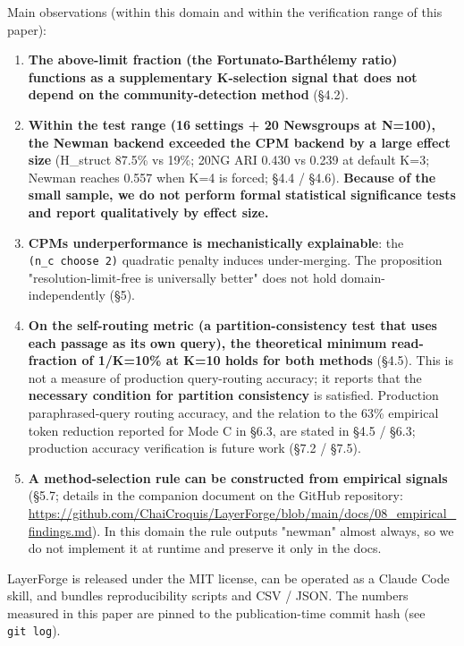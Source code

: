 \documentclass[
]{article}
\providecommand{\tightlist}{%
  \setlength{\itemsep}{0pt}\setlength{\parskip}{0pt}}
\begin{document}
Main observations (within this domain and within the verification range
of this paper):

\begin{enumerate}
\def\labelenumi{\arabic{enumi}.}
\tightlist
\item
  \textbf{The above-limit fraction (the Fortunato-Barthélemy ratio)
  functions as a supplementary K-selection signal that does not depend
  on the community-detection method} (§4.2).
\item
  \textbf{Within the test range (16 settings + 20 Newsgroups at N=100),
  the Newman backend exceeded the CPM backend by a large effect size}
  (H\_struct 87.5\% vs 19\%; 20NG ARI 0.430 vs 0.239 at default K=3;
  Newman reaches 0.557 when K=4 is forced; §4.4 / §4.6). \textbf{Because
  of the small sample, we do not perform formal statistical significance
  tests and report qualitatively by effect size.}
\item
  \textbf{CPM\textquotesingle s underperformance is mechanistically
  explainable}: the \texttt{(n\_c\ choose\ 2)} quadratic penalty induces
  under-merging. The proposition "resolution-limit-free is universally
  better" does not hold domain-independently (§5).
\item
  \textbf{On the self-routing metric (a partition-consistency test that
  uses each passage as its own query), the theoretical minimum
  read-fraction of 1/K=10\% at K=10 holds for both methods} (§4.5). This
  is not a measure of production query-routing accuracy; it reports that
  the \textbf{necessary condition for partition consistency} is
  satisfied. Production paraphrased-query routing accuracy, and the
  relation to the 63\% empirical token reduction reported for Mode C in
  §6.3, are stated in §4.5 / §6.3; production accuracy verification is
  future work (§7.2 / §7.5).
\item
  \textbf{A method-selection rule can be constructed from empirical
  signals} (§5.7; details in the companion document on the GitHub
  repository:
  \url{https://github.com/ChaiCroquis/LayerForge/blob/main/docs/08_empirical_findings.md}).
  In this domain the rule outputs "newman" almost always, so we do not
  implement it at runtime and preserve it only in the docs.
\end{enumerate}

LayerForge is released under the MIT license, can be operated as a
Claude Code skill, and bundles reproducibility scripts and CSV / JSON.
The numbers measured in this paper are pinned to the publication-time
commit hash (see \texttt{git\ log}).
\end{document}

